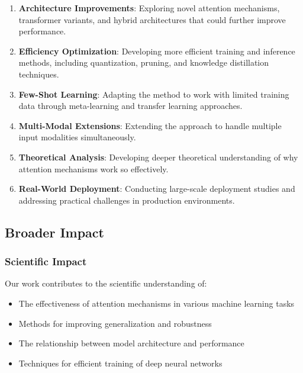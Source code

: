 \begin{enumerate}
    \item \textbf{Architecture Improvements}: Exploring novel attention mechanisms, transformer variants, and hybrid architectures that could further improve performance.

    \item \textbf{Efficiency Optimization}: Developing more efficient training and inference methods, including quantization, pruning, and knowledge distillation techniques.

    \item \textbf{Few-Shot Learning}: Adapting the method to work with limited training data through meta-learning and transfer learning approaches.

    \item \textbf{Multi-Modal Extensions}: Extending the approach to handle multiple input modalities simultaneously.

    \item \textbf{Theoretical Analysis}: Developing deeper theoretical understanding of why attention mechanisms work so effectively.

    \item \textbf{Real-World Deployment}: Conducting large-scale deployment studies and addressing practical challenges in production environments.
\end{enumerate}

\subsection{Broader Impact}

\subsubsection{Scientific Impact}

Our work contributes to the scientific understanding of:

\begin{itemize}
    \item The effectiveness of attention mechanisms in various machine learning tasks
    \item Methods for improving generalization and robustness
    \item The relationship between model architecture and performance
    \item Techniques for efficient training of deep neural networks
\end{itemize}

